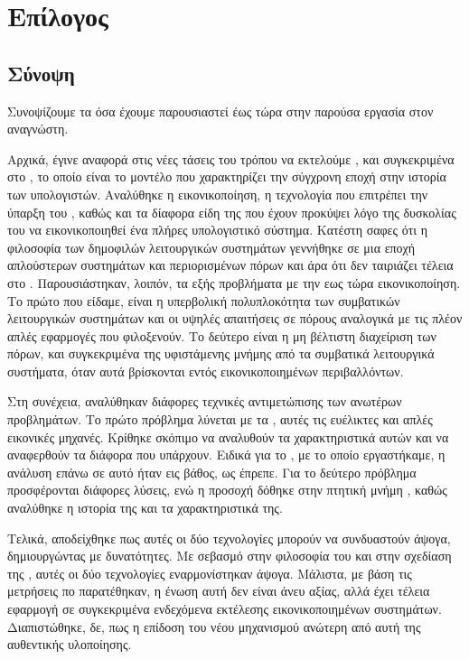 \chapter{Επίλογος}

\section{Σύνοψη}

Συνοψίζουμε τα όσα έχουμε παρουσιαστεί έως τώρα στην παρούσα εργασία στον αναγνώστη.
\newline

Αρχικά, έγινε αναφορά στις νέες τάσεις του τρόπου να εκτελούμε
, και συγκεκριμένα στο ,
το οποίο είναι το μοντέλο που χαρακτηρίζει την σύγχρονη εποχή
στην ιστορία των υπολογιστών. Αναλύθηκε η εικονικοποίηση, η
τεχνολογία που επιτρέπει την ύπαρξη του , καθώς
και τα δίαφορα είδη της που έχουν προκύψει λόγο της δυσκολίας του
να εικονικοποιηθεί ένα πλήρες υπολογιστικό σύστημα. Κατέστη
σαφες ότι η φιλοσοφία των δημοφιλών λειτουργικών συστημάτων
γεννήθηκε σε μια εποχή απλούστερων συστημάτων και περιορισμένων
πόρων και άρα ότι δεν ταιριάζει τέλεια στο .
Παρουσιάστηκαν, λοιπόν, τα εξής προβλήματα με την εως τώρα
εικονικοποίηση. Το πρώτο που είδαμε, είναι η υπερβολική
πολυπλοκότητα των συμβατικών λειτουργικών συστημάτων και οι
υψηλές απαιτήσεις σε πόρους αναλογικά με τις πλέον απλές
εφαρμογές που φιλοξενούν. Το δεύτερο είναι η μη βέλτιστη
διαχείριση των πόρων, και συγκεκριμένα της υφιστάμενης μνήμης
από τα συμβατικά λειτουργικά συστήματα, όταν αυτά βρίσκονται εντός
εικονικοποιημένων περιβαλλόντων.
\newline

Στη συνέχεια, αναλύθηκαν διάφορες τεχνικές αντιμετώπισης των ανωτέρων προβλημάτων.
Το πρώτο πρόβλημα λύνεται με τα , αυτές τις ευέλικτες και απλές
εικονικές μηχανές. Κρίθηκε σκόπιμο να αναλυθούν τα
χαρακτηριστικά αυτών και να αναφερθούν τα διάφορα
 που υπάρχουν. Ειδικά για το , με το οποίο εργαστήκαμε, η ανάλυση επάνω σε
αυτό ήταν εις βάθος, ως έπρεπε. Για το δεύτερο
πρόβλημα προσφέρονται διάφορες λύσεις, ενώ η προσοχή δόθηκε
στην πτητική μνήμη , καθώς αναλύθηκε η ιστορία
της και τα χαρακτηριστικά της.
\newline

Τελικά, αποδείχθηκε πως αυτές οι δύο τεχνολογίες μπορούν να
συνδυαστούν άψογα, δημιουργώντας  με  δυνατότητες.
Με σεβασμό στην φιλοσοφία του  και στην σχεδίαση της , αυτές
οι δύο τεχνολογίες εναρμονίστηκαν άψογα.
Μάλιστα, με βάση τις μετρήσεις πο παρατέθηκαν, η ένωση αυτή
δεν είναι άνευ αξίας, αλλά έχει τέλεια εφαρμογή σε συγκεκριμένα
ενδεχόμενα εκτέλεσης εικονικοποιημένων συστημάτων. Διαπιστώθηκε, δε, πως
η επίδοση του νέου μηχανισμού ανώτερη από αυτή της αυθεντικής υλοποίησης.




